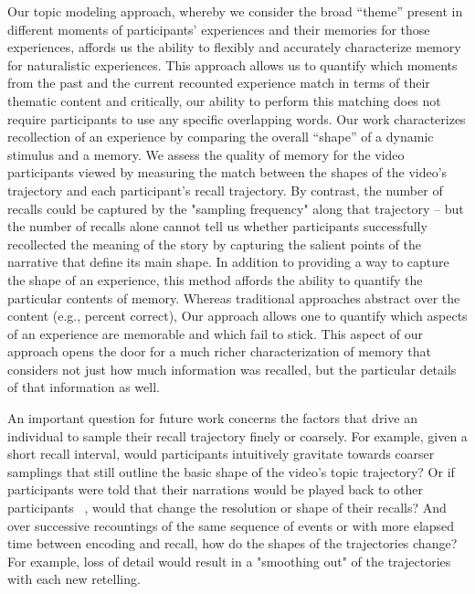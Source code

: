 Our topic modeling approach, whereby we consider the broad ``theme'' present in different moments of participants' experiences and their memories for those experiences, affords us the ability to flexibly and accurately characterize memory for naturalistic experiences. This approach allows us to quantify which moments from the past and the current recounted experience match in terms of their thematic content and critically, our ability to perform this matching does not require participants to use any specific overlapping words. Our work characterizes recollection of an experience by comparing the overall ``shape'' of a dynamic stimulus and a memory. We assess the quality of memory for the video participants viewed by measuring the match between the shapes of the video's trajectory and each participant's recall trajectory. By contrast, the number of recalls could be captured by the "sampling frequency" along that trajectory -- but the number of recalls alone cannot tell us whether participants successfully recollected the meaning of the story by capturing the salient points of the narrative that define its main shape. In addition to providing a way to capture the shape of an experience, this method affords the ability to quantify the particular contents of memory.  Whereas traditional approaches abstract over the content (e.g., percent correct), Our approach allows one to quantify which aspects of an experience are memorable and which fail to stick. This aspect of our approach opens the door for a much richer characterization of memory that considers not just how much information was recalled, but the particular details of that information as well.

An important question for future work concerns the factors that drive an individual to sample their recall trajectory finely or coarsely. For example, given a short recall interval, would participants intuitively gravitate towards coarser samplings that still outline the basic shape of the video's topic trajectory? Or if participants were told that their narrations would be played back to other participants ~\citep{ZadbEtal17}, would that change the resolution or shape of their recalls? And over successive recountings of the same sequence of events or with more elapsed time between encoding and recall, how do the shapes of the trajectories change? For example, loss of detail would result in a "smoothing out" of the trajectories with each new retelling.

